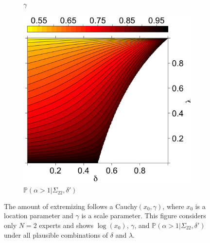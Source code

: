 \documentclass[11pt]{article}
\renewcommand{\P}{\mathbb{P}}
\theoremstyle{definition}
\theoremstyle{definition}
\def\P{{\mathbb P}}
\begin{document}
\begin{figure}[t]
\begin{subfigure}[b]{0.33\textwidth}
\caption{$\gamma$}
\label{gammaOracle}
        \end{subfigure}
\hspace{-1.3em}
    \begin{subfigure}[b]{0.33\textwidth}
        \includegraphics[width=1.07\textwidth, height = \textwidth]{Probs}
\caption{$\P(\alpha > 1 | \Sigma_{22}, \delta')$}
\label{probOracle}
        \end{subfigure}

    \caption{ The amount of extremizing follows a 
Cauchy$(x_0, \gamma)$, where $x_0$ is a location parameter and $\gamma$ 
is a scale parameter.  This figure considers only $N = 2$ experts and 
shows $\log(x_0)$, $\gamma$, and $\P(\alpha > 1 | \Sigma_{22}, \delta')$ 
under all plausible combinations of $\delta$ and $\lambda$.}
        \label{LevelplotsOracle}
\end{figure}
 
\end{document}
